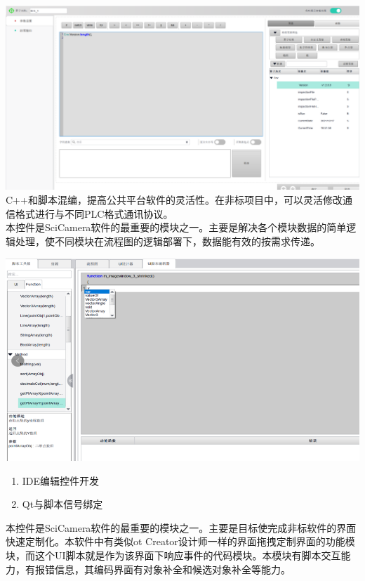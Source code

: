 \documentclass[lighthipster]{simplehipstercv}
\begin{document}
\begin{minipage}[t]{\textwidth}
		\begin{minipage}[t]{0.5\textwidth}
		\begin{flushleft}
			\includegraphics[width=0.8\linewidth]{PrjOPT_3.png} 
			\vfill
			\vspace{5em}
			C++和脚本混编，提高公共平台软件的灵活性。在非标项目中，可以灵活修改通信格式进行与不同PLC格式通讯协议。
			\\本控件是SciCamera软件的最重要的模块之一。主要是解决各个模块数据的简单逻辑处理，使不同模块在流程图的逻辑部署下，数据能有效的按需求传递。
		\end{flushleft}
		\end{minipage}
		\hspace*{1.6em}
		\begin{minipage}[t]{0.5\textwidth}
		\begin{flushleft}
			\includegraphics[width=0.8\linewidth]{PrjOPT_4.png}
			\begin{enumerate}
				\item IDE编辑控件开发
				\item Qt与脚本信号绑定
			\end{enumerate}
			本控件是SciCamera软件的最重要的模块之一。主要是目标使完成非标软件的界面快速定制化。本软件中有类似ot Creator设计师一样的界面拖拽定制界面的功能模块，而这个UI脚本就是作为该界面下响应事件的代码模块。本模块有脚本交互能力，有报错信息，其编码界面有对象补全和候选对象补全等能力。
		\end{flushleft}
		\end{minipage}
		\bigskip
	\end{minipage}
	\vspace{1em}
	
\end{document}
